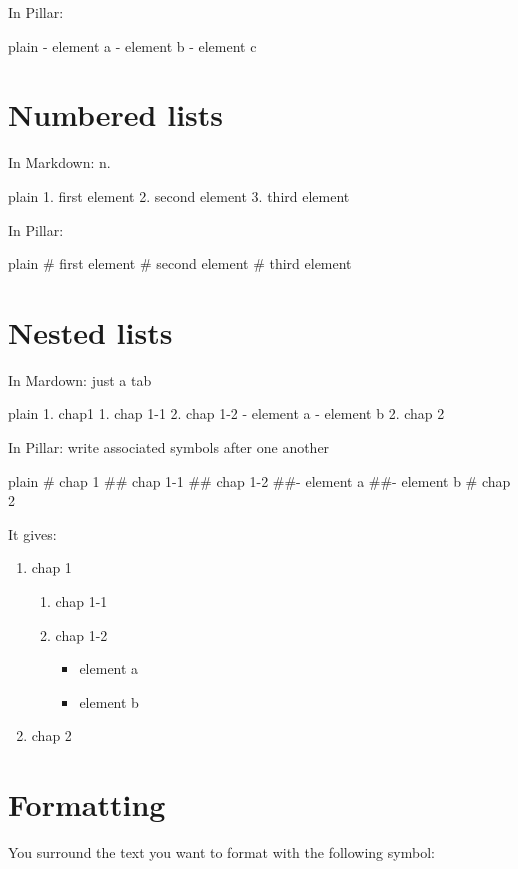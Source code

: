 \documentclass[10pt,twoside,english]{_support/latex/sbabook/sbabook}
\begin{document}
In Pillar: \textcode{-}

\begin{displaycode}{plain}
- element a
- element b
- element c
\end{displaycode}
\section{Numbered lists}
In Markdown: n.

\begin{displaycode}{plain}
1. first element
2. second element
3. third element
\end{displaycode}

In Pillar: \textcode{\#}

\begin{displaycode}{plain}
# first element
# second element
# third element
\end{displaycode}
\section{Nested lists}
In Mardown: just a tab

\begin{displaycode}{plain}
1. chap1
    1. chap 1-1
    2. chap 1-2
        - element a 
        - element b
2. chap 2
\end{displaycode}

In Pillar: write associated symbols after one another

\begin{displaycode}{plain}
# chap 1
## chap 1-1
## chap 1-2
##- element a 
##- element b
# chap 2
\end{displaycode}

It gives:

\begin{enumerate}
\item chap 1
\begin{enumerate}
\item chap 1-1
\item chap 1-2
\begin{itemize}
\item element a 
\item element b
\end{itemize}

\end{enumerate}

\item chap 2
\end{enumerate}
\section{Formatting}
You surround the text you want to format with the following symbol:
\end{document}
